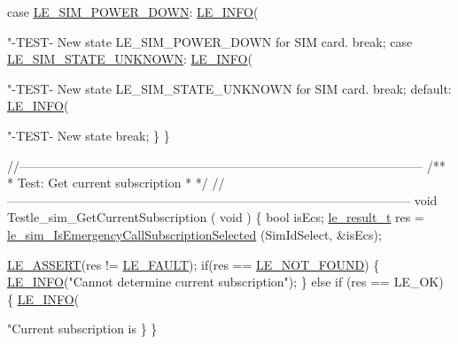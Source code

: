 \begin{DoxyCodeInclude}
{{{{{{{{        \textcolor{keywordflow}{case} \hyperlink{le__sim__interface_8h_a21b9bb7d5e5e7ece213e00738a5bae41affe6278346f2d16ba331f900b58f1ce9}{LE\_SIM\_POWER\_DOWN}:
            \hyperlink{le__log_8h_a23e6d206faa64f612045d688cdde5808}{LE\_INFO}(\textcolor{stringliteral}{"-TEST- New state LE\_SIM\_POWER\_DOWN for SIM card.%
            \textcolor{keywordflow}{break};
        \textcolor{keywordflow}{case} \hyperlink{le__sim__interface_8h_a21b9bb7d5e5e7ece213e00738a5bae41ad82522676bf094ea402a0311356e434f}{LE\_SIM\_STATE\_UNKNOWN}:
            \hyperlink{le__log_8h_a23e6d206faa64f612045d688cdde5808}{LE\_INFO}(\textcolor{stringliteral}{"-TEST- New state LE\_SIM\_STATE\_UNKNOWN for SIM card.%
            \textcolor{keywordflow}{break};
        \textcolor{keywordflow}{default}:
            \hyperlink{le__log_8h_a23e6d206faa64f612045d688cdde5808}{LE\_INFO}(\textcolor{stringliteral}{"-TEST- New state %
            \textcolor{keywordflow}{break};
    \}
\}

\textcolor{comment}{//--------------------------------------------------------------------------------------------------}\textcolor{comment}{}
\textcolor{comment}{/**}
\textcolor{comment}{ * Test: Get current subscription}
\textcolor{comment}{ *}
\textcolor{comment}{ */}
\textcolor{comment}{//--------------------------------------------------------------------------------------------------}
\textcolor{keywordtype}{void} Testle\_sim\_GetCurrentSubscription
(
    \textcolor{keywordtype}{void}
)
\{
    \textcolor{keywordtype}{bool} isEcs;
    \hyperlink{le__basics_8h_a1cca095ed6ebab24b57a636382a6c86c}{le\_result\_t} res = \hyperlink{le__sim__interface_8h_a837cdc0fe30761f4339f846a0b44c5f1}{le\_sim\_IsEmergencyCallSubscriptionSelected}
      (SimIdSelect, &isEcs);

    \hyperlink{le__log_8h_ac0dbbef91dc0fed449d0092ff0557b39}{LE\_ASSERT}(res != \hyperlink{le__basics_8h_a1cca095ed6ebab24b57a636382a6c86cac409634423b6b1ef09643529f6224798}{LE\_FAULT});
    \textcolor{keywordflow}{if}(res == \hyperlink{le__basics_8h_a1cca095ed6ebab24b57a636382a6c86ca77a7505b0443df2fa1bab375c7267637}{LE\_NOT\_FOUND})
    \{
        \hyperlink{le__log_8h_a23e6d206faa64f612045d688cdde5808}{LE\_INFO}(\textcolor{stringliteral}{"Cannot determine current subscription"});
    \}
    \textcolor{keywordflow}{else} \textcolor{keywordflow}{if} (res == LE\_OK)
    \{
        \hyperlink{le__log_8h_a23e6d206faa64f612045d688cdde5808}{LE\_INFO}(\textcolor{stringliteral}{"Current subscription is %
    \}
\}

}}}}}}}}}}}}
\end{DoxyCodeInclude}
